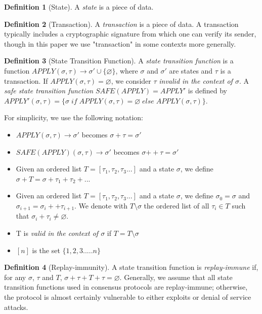 \documentclass[11pt,a4paper]{report}
\theoremstyle{plain}
\theoremstyle{definition}
\newtheorem{defn}{Definition}[chapter]
\theoremstyle{remark}
\begin{document}
\begin{defn}[State]
A \emph{state} is a piece of data.
\end{defn}

\begin{defn}[Transaction]
A \emph{transaction} is a piece of data. A transaction typically includes a cryptographic signature from which one can verify its sender, though in this paper we use "transaction" in some contexts more generally.
\end{defn}

\begin{defn}[State Transition Function]
A \emph{state transition function} is a function $APPLY(\sigma, \tau) \rightarrow \sigma' \cup \{\varnothing\}$, where $\sigma$ and $\sigma'$ are states and $\tau$ is a transaction. If $APPLY(\sigma, \tau) = \varnothing$, we consider $\tau$ \emph{invalid in the context of $\sigma$}. A \emph{safe state transition function} $SAFE(APPLY) = APPLY'$ is defined by $APPLY'(\sigma, \tau) = \{\sigma \; if \; APPLY(\sigma, \tau) = \varnothing \; else \; APPLY(\sigma, \tau)\}$.
\end{defn}

For simplicity, we use the following notation:

\begin{itemize}
\item
$APPLY(\sigma, \tau) \rightarrow \sigma'$ becomes $\sigma + \tau = \sigma'$
\item
$SAFE(APPLY)(\sigma, \tau) \rightarrow \sigma'$ becomes $\sigma {++} \tau = \sigma'$
\item  
Given an ordered list $T = [\tau_1, \tau_2, \tau_3...]$ and a state $\sigma$, we define $\sigma + T = \sigma + \tau_1 + \tau_2 + ...$
\item
Given an ordered list $T = [\tau_1, \tau_2, \tau_3...]$ and a state $\sigma$, we define $\sigma_0 = \sigma$ and $\sigma_{i+1} = \sigma_i ++ \tau_{i+1}$. We denote with $T \setminus \sigma$ the ordered list of all $\tau_i \in T$ such that $\sigma_i + \tau_i \ne \varnothing$.
\item
T is \emph{valid in the context of $\sigma$} if $T = T \setminus \sigma$
\item
$[n]$ is the set $\{1, 2, 3..... n\}$
\end{itemize}

\begin{defn}[Replay-immunity]
A state transition function is \emph{replay-immune} if, for any $\sigma$, $\tau$ and $T$, $\sigma + \tau + T + \tau = \varnothing$. Generally, we assume that all state transition functions used in consensus protocols are replay-immune; otherwise, the protocol is almost certainly vulnerable to either exploits or denial of service attacks.
\end{defn}
\end{document}
